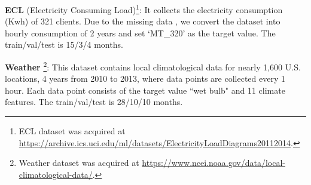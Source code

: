 \textbf{ECL} (Electricity Consuming Load)\footnote{ECL dataset was acquired at \url{https://archive.ics.uci.edu/ml/datasets/ElectricityLoadDiagrams20112014}.}: It collects the electricity consumption (Kwh) of 321 clients. Due to the missing data \cite{li2019enhancing}, we convert the dataset into hourly consumption of 2 years and set `MT\_320' as the target value. The train/val/test is 15/3/4 months.

\textbf{Weather} \footnote{Weather dataset was acquired at \url{https://www.ncei.noaa.gov/data/local-climatological-data/}.}: This dataset contains local climatological data for nearly 1,600 U.S. locations, 4 years from 2010 to 2013, where data points are collected every 1 hour. Each data point consists of the target value ``wet bulb" and 11 climate features. The train/val/test is 28/10/10 months.


